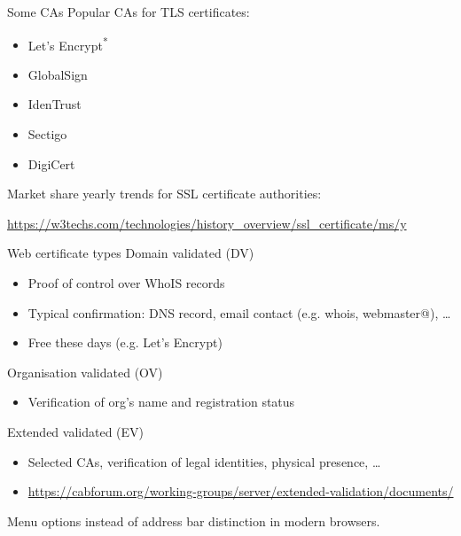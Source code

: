 \begin{frame}{Some CAs}
  Popular CAs for TLS certificates:
  \begin{itemize}[<+(1)->]
    \item Let's Encrypt\textsuperscript{*}
    \item GlobalSign
    \item IdenTrust
    \item Sectigo
    \item DigiCert
  \end{itemize}
  
  \vfill

  \pause
  Market share yearly trends for SSL certificate authorities:

  {\scriptsize\url{https://w3techs.com/technologies/history_overview/ssl_certificate/ms/y}}
\end{frame}

\begin{frame}{Web certificate types}
  Domain validated (DV)
  \begin{itemize}[<+(1)->]
    \item Proof of control over WhoIS records
    \item Typical confirmation: DNS record, email contact (e.g. whois, webmaster@), \dots
    \item Free these days (e.g. Let's Encrypt)
  \end{itemize}

  \pause
  Organisation validated (OV)
  \begin{itemize}[<+(1)->]
    \item Verification of org's name and registration status
  \end{itemize}

  \pause
  Extended validated (EV)
  \begin{itemize}[<+(1)->]
    \item Selected CAs, verification of legal identities, physical presence, \dots
    \item {\scriptsize\url{https://cabforum.org/working-groups/server/extended-validation/documents/}}
  \end{itemize}

  \pause
  Menu options instead of address bar distinction in modern browsers.
\end{frame}


